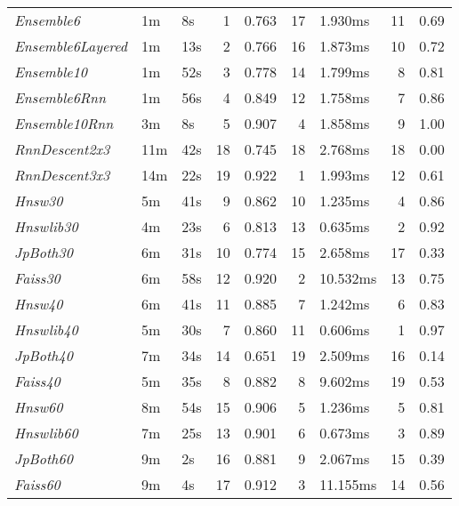 \begin{tabular}{lllrrrlrl}
\toprule
\midrule
\emph{Ensemble6} & 1m & 8s & 1 & 0.763 & 17 & 1.930ms & 11 & 0.69 \\
\emph{Ensemble6Layered} & 1m & 13s & 2 & 0.766 & 16 & 1.873ms & 10 & 0.72 \\
\emph{Ensemble10} & 1m & 52s & 3 & 0.778 & 14 & 1.799ms & 8 & 0.81 \\
\emph{Ensemble6Rnn} & 1m & 56s & 4 & 0.849 & 12 & 1.758ms & 7 & 0.86 \\
\emph{Ensemble10Rnn} & 3m & 8s & 5 & 0.907 & 4 & 1.858ms & 9 & 1.00 \\
\emph{RnnDescent2x3} & 11m & 42s & 18 & 0.745 & 18 & 2.768ms & 18 & 0.00 \\
\emph{RnnDescent3x3} & 14m & 22s & 19 & 0.922 & 1 & 1.993ms & 12 & 0.61 \\
\emph{Hnsw30} & 5m & 41s & 9 & 0.862 & 10 & 1.235ms & 4 & 0.86 \\
\emph{Hnswlib30} & 4m & 23s & 6 & 0.813 & 13 & 0.635ms & 2 & 0.92 \\
\emph{JpBoth30} & 6m & 31s & 10 & 0.774 & 15 & 2.658ms & 17 & 0.33 \\
\emph{Faiss30} & 6m & 58s & 12 & 0.920 & 2 & 10.532ms & 13 & 0.75 \\
\emph{Hnsw40} & 6m & 41s & 11 & 0.885 & 7 & 1.242ms & 6 & 0.83 \\
\emph{Hnswlib40} & 5m & 30s & 7 & 0.860 & 11 & 0.606ms & 1 & 0.97 \\
\emph{JpBoth40} & 7m & 34s & 14 & 0.651 & 19 & 2.509ms & 16 & 0.14 \\
\emph{Faiss40} & 5m & 35s & 8 & 0.882 & 8 & 9.602ms & 19 & 0.53 \\
\emph{Hnsw60} & 8m & 54s & 15 & 0.906 & 5 & 1.236ms & 5 & 0.81 \\
\emph{Hnswlib60} & 7m & 25s & 13 & 0.901 & 6 & 0.673ms & 3 & 0.89 \\
\emph{JpBoth60} & 9m & 2s & 16 & 0.881 & 9 & 2.067ms & 15 & 0.39 \\
\emph{Faiss60} & 9m & 4s & 17 & 0.912 & 3 & 11.155ms & 14 & 0.56 \\
\bottomrule
\end{tabular}

